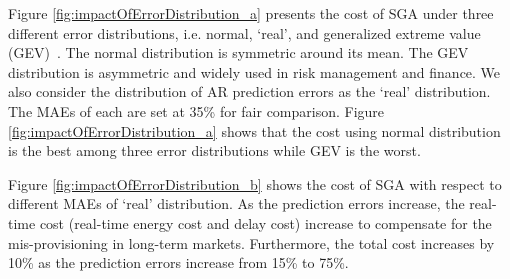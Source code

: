 Figure \ref{fig:impactOfErrorDistribution_a} presents the cost of SGA under three different error distributions, i.e. normal, `real', and generalized extreme value (GEV)~\cite{corcoran2002modelling}. The normal distribution is symmetric around its mean. The GEV distribution is asymmetric and widely used in risk management and finance. We also consider the distribution of AR prediction errors as the `real' distribution. The MAEs of each are set at 35\% for fair comparison. Figure \ref{fig:impactOfErrorDistribution_a} shows that the cost using normal distribution is the best among three error distributions while GEV is the worst. %

Figure \ref{fig:impactOfErrorDistribution_b} shows the cost of SGA with respect to different MAEs of `real' distribution.  As the prediction errors increase, the real-time cost (real-time energy cost and delay cost) increase to compensate for the mis-provisioning in long-term markets. Furthermore, the total cost increases by 10\% as the prediction errors increase from 15\% to 75\%. 

